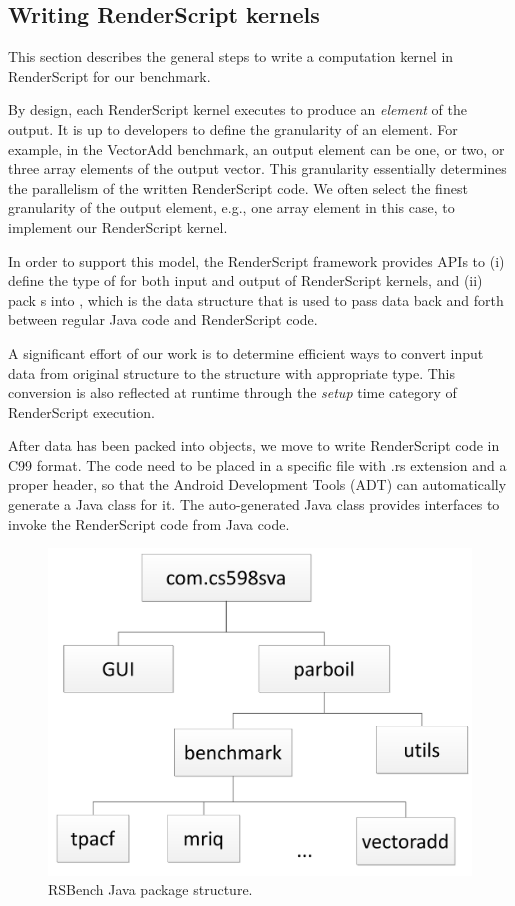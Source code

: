 \subsection*{Writing RenderScript kernels}
This section describes the general steps to write a computation kernel in
RenderScript for our benchmark.

By design, each RenderScript kernel executes to produce an \textit{element} of
the output. It is up to developers to define the granularity of an element. For
example, in the VectorAdd benchmark, an output element can be one, or two, or
three array elements of the output vector. This granularity essentially
determines the parallelism of the written RenderScript code. We often select the
finest granularity of the output element, e.g., one array element in this case,
to implement our RenderScript kernel.


In order to support this model, the RenderScript framework provides APIs to (i)
define the type of  for both input and output of RenderScript
kernels, and (ii) pack s into , which is the data
structure that is used to pass data back and forth between regular Java code and
RenderScript code.

A significant effort of our work is to determine efficient ways to convert input
data from original structure to the  structure with appropriate
 type. This conversion is also reflected at runtime through the
\textit{setup} time category of RenderScript execution.

After data has been packed into  objects, we move to write
RenderScript code in C99 format. The code need to be placed in a specific file
with .rs extension and a proper header, so that the Android Development Tools
(ADT) can automatically generate a Java class for it. The auto-generated Java
class provides interfaces to invoke the RenderScript code from Java code.

\begin{figure}[t!]
\centering
\includegraphics[scale=0.65]{figs/package_diagram.pdf}
\caption{RSBench Java package structure.}
\label{fig:package_structure}
\centering
\end{figure}


